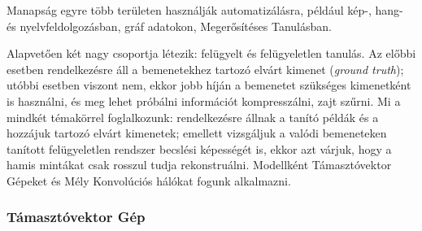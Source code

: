 Manapság egyre több területen használják automatizálásra, például kép-, hang- és nyelvfeldolgozásban, gráf adatokon, Megerősítéses Tanulásban.%

Alapvetően két nagy csoportja létezik: felügyelt és felügyeletlen tanulás.
Az előbbi esetben rendelkezésre áll a bemenetekhez tartozó elvárt kimenet (\textit{ground truth}); utóbbi esetben viszont nem, ekkor jobb híján a bemenetet szükséges kimenetként is használni, és meg lehet próbálni információt kompresszálni, zajt szűrni.  %
Mi a mindkét témakörrel foglalkozunk: rendelkezésre állnak a tanító példák és a hozzájuk
tartozó elvárt kimenetek; emellett vizsgáljuk a valódi bemeneteken tanított felügyeletlen rendszer becslési képességét is, ekkor azt várjuk, hogy a hamis mintákat csak rosszul tudja rekonstruálni. Modellként Támasztóvektor Gépeket és Mély Konvolúciós hálókat
fogunk alkalmazni.


\subsubsection{Támasztóvektor Gép}

